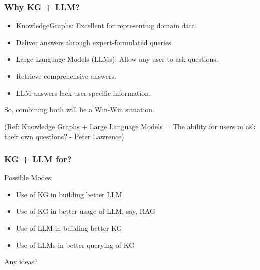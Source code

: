 

\begin{frame}[fragile]\frametitle{Why KG + LLM?}

\begin{itemize}
\item KnowledgeGraphs: Excellent for representing domain data.
\item Deliver answers through expert-formulated queries.
\item Large Language Models (LLMs): Allow any user to ask questions.
\item Retrieve comprehensive answers.
\item LLM answers lack user-specific information.
\end{itemize}
	
So, combining both will be a Win-Win situation.

{\tiny (Ref: Knowledge Graphs + Large Language Models = The ability for users to ask their own questions? - Peter Lawrence)}

\end{frame}

\begin{frame}[fragile]\frametitle{KG + LLM for?}

Possible Modes:
\begin{itemize}
\item Use of KG in building better LLM
\item Use of KG in better usage of LLM, say, RAG
\item Use of LLM in building better KG
\item Use of LLMs in better querying of KG
\end{itemize}
	
Any ideas?

\end{frame}

